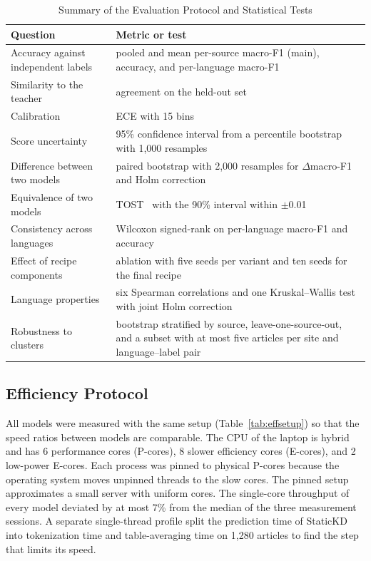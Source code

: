 \documentclass{ieeeaccess}
\begin{document}
\begin{table}[!t]
\caption{Summary of the Evaluation Protocol and Statistical Tests}
\label{tab:protocol}
\centering
\footnotesize
\setlength{\tabcolsep}{3pt}
\begin{tabular}{@{}p{}p{}@{}}
\toprule
Question & Metric or test \\
\midrule
Accuracy against independent labels & pooled and mean per-source macro-F1 (main), accuracy, and per-language macro-F1 \\
Similarity to the teacher & agreement on the held-out set \\
Calibration & ECE with 15 bins \\
Score uncertainty & 95\% confidence interval from a percentile bootstrap with 1,000 resamples \\
Difference between two models & paired bootstrap with 2,000 resamples for $\Delta$macro-F1~\cite{koehn2004significance} and Holm correction~\cite{holm1979} \\
Equivalence of two models & TOST~\cite{schuirmann1987tost} with the 90\% interval within $\pm$0.01 \\
Consistency across languages & Wilcoxon signed-rank on per-language macro-F1 and accuracy~\cite{dror2018hitchhiker} \\
Effect of recipe components & ablation with five seeds per variant and ten seeds for the final recipe \\
Language properties & six Spearman correlations and one Kruskal--Wallis test with joint Holm correction \\
Robustness to clusters & bootstrap stratified by source, leave-one-source-out, and a subset with at most five articles per site and language--label pair \\
\bottomrule
\end{tabular}
\end{table}

\subsection{Efficiency Protocol}
\label{sec:effprotocol}
All models were measured with the same setup (Table~\ref{tab:effsetup}) so that the speed ratios between models are comparable. The CPU of the laptop is hybrid and has 6 performance cores (P-cores), 8 slower efficiency cores (E-cores), and 2 low-power E-cores. Each process was pinned to physical P-cores because the operating system moves unpinned threads to the slow cores. The pinned setup approximates a small server with uniform cores. The single-core throughput of every model deviated by at most 7\% from the median of the three measurement sessions. A separate single-thread profile split the prediction time of StaticKD into tokenization time and table-averaging time on 1,280 articles to find the step that limits its speed.
\end{document}
